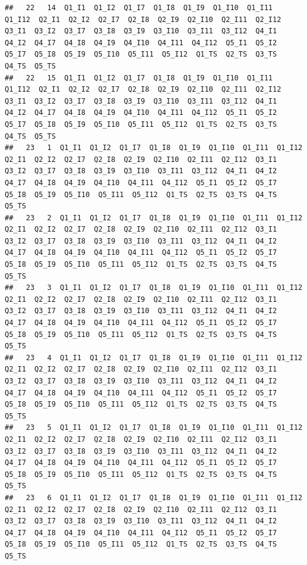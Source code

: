 \documentclass[]{book}
\begin{document}
\begin{verbatim}
##   22   14  Q1_I1  Q1_I2  Q1_I7  Q1_I8  Q1_I9  Q1_I10  Q1_I11  Q1_I12  Q2_I1  Q2_I2  Q2_I7  Q2_I8  Q2_I9  Q2_I10  Q2_I11  Q2_I12  Q3_I1  Q3_I2  Q3_I7  Q3_I8  Q3_I9  Q3_I10  Q3_I11  Q3_I12  Q4_I1  Q4_I2  Q4_I7  Q4_I8  Q4_I9  Q4_I10  Q4_I11  Q4_I12  Q5_I1  Q5_I2  Q5_I7  Q5_I8  Q5_I9  Q5_I10  Q5_I11  Q5_I12  Q1_TS  Q2_TS  Q3_TS  Q4_TS  Q5_TS
##   22   15  Q1_I1  Q1_I2  Q1_I7  Q1_I8  Q1_I9  Q1_I10  Q1_I11  Q1_I12  Q2_I1  Q2_I2  Q2_I7  Q2_I8  Q2_I9  Q2_I10  Q2_I11  Q2_I12  Q3_I1  Q3_I2  Q3_I7  Q3_I8  Q3_I9  Q3_I10  Q3_I11  Q3_I12  Q4_I1  Q4_I2  Q4_I7  Q4_I8  Q4_I9  Q4_I10  Q4_I11  Q4_I12  Q5_I1  Q5_I2  Q5_I7  Q5_I8  Q5_I9  Q5_I10  Q5_I11  Q5_I12  Q1_TS  Q2_TS  Q3_TS  Q4_TS  Q5_TS
##   23   1  Q1_I1  Q1_I2  Q1_I7  Q1_I8  Q1_I9  Q1_I10  Q1_I11  Q1_I12  Q2_I1  Q2_I2  Q2_I7  Q2_I8  Q2_I9  Q2_I10  Q2_I11  Q2_I12  Q3_I1  Q3_I2  Q3_I7  Q3_I8  Q3_I9  Q3_I10  Q3_I11  Q3_I12  Q4_I1  Q4_I2  Q4_I7  Q4_I8  Q4_I9  Q4_I10  Q4_I11  Q4_I12  Q5_I1  Q5_I2  Q5_I7  Q5_I8  Q5_I9  Q5_I10  Q5_I11  Q5_I12  Q1_TS  Q2_TS  Q3_TS  Q4_TS  Q5_TS
##   23   2  Q1_I1  Q1_I2  Q1_I7  Q1_I8  Q1_I9  Q1_I10  Q1_I11  Q1_I12  Q2_I1  Q2_I2  Q2_I7  Q2_I8  Q2_I9  Q2_I10  Q2_I11  Q2_I12  Q3_I1  Q3_I2  Q3_I7  Q3_I8  Q3_I9  Q3_I10  Q3_I11  Q3_I12  Q4_I1  Q4_I2  Q4_I7  Q4_I8  Q4_I9  Q4_I10  Q4_I11  Q4_I12  Q5_I1  Q5_I2  Q5_I7  Q5_I8  Q5_I9  Q5_I10  Q5_I11  Q5_I12  Q1_TS  Q2_TS  Q3_TS  Q4_TS  Q5_TS
##   23   3  Q1_I1  Q1_I2  Q1_I7  Q1_I8  Q1_I9  Q1_I10  Q1_I11  Q1_I12  Q2_I1  Q2_I2  Q2_I7  Q2_I8  Q2_I9  Q2_I10  Q2_I11  Q2_I12  Q3_I1  Q3_I2  Q3_I7  Q3_I8  Q3_I9  Q3_I10  Q3_I11  Q3_I12  Q4_I1  Q4_I2  Q4_I7  Q4_I8  Q4_I9  Q4_I10  Q4_I11  Q4_I12  Q5_I1  Q5_I2  Q5_I7  Q5_I8  Q5_I9  Q5_I10  Q5_I11  Q5_I12  Q1_TS  Q2_TS  Q3_TS  Q4_TS  Q5_TS
##   23   4  Q1_I1  Q1_I2  Q1_I7  Q1_I8  Q1_I9  Q1_I10  Q1_I11  Q1_I12  Q2_I1  Q2_I2  Q2_I7  Q2_I8  Q2_I9  Q2_I10  Q2_I11  Q2_I12  Q3_I1  Q3_I2  Q3_I7  Q3_I8  Q3_I9  Q3_I10  Q3_I11  Q3_I12  Q4_I1  Q4_I2  Q4_I7  Q4_I8  Q4_I9  Q4_I10  Q4_I11  Q4_I12  Q5_I1  Q5_I2  Q5_I7  Q5_I8  Q5_I9  Q5_I10  Q5_I11  Q5_I12  Q1_TS  Q2_TS  Q3_TS  Q4_TS  Q5_TS
##   23   5  Q1_I1  Q1_I2  Q1_I7  Q1_I8  Q1_I9  Q1_I10  Q1_I11  Q1_I12  Q2_I1  Q2_I2  Q2_I7  Q2_I8  Q2_I9  Q2_I10  Q2_I11  Q2_I12  Q3_I1  Q3_I2  Q3_I7  Q3_I8  Q3_I9  Q3_I10  Q3_I11  Q3_I12  Q4_I1  Q4_I2  Q4_I7  Q4_I8  Q4_I9  Q4_I10  Q4_I11  Q4_I12  Q5_I1  Q5_I2  Q5_I7  Q5_I8  Q5_I9  Q5_I10  Q5_I11  Q5_I12  Q1_TS  Q2_TS  Q3_TS  Q4_TS  Q5_TS
##   23   6  Q1_I1  Q1_I2  Q1_I7  Q1_I8  Q1_I9  Q1_I10  Q1_I11  Q1_I12  Q2_I1  Q2_I2  Q2_I7  Q2_I8  Q2_I9  Q2_I10  Q2_I11  Q2_I12  Q3_I1  Q3_I2  Q3_I7  Q3_I8  Q3_I9  Q3_I10  Q3_I11  Q3_I12  Q4_I1  Q4_I2  Q4_I7  Q4_I8  Q4_I9  Q4_I10  Q4_I11  Q4_I12  Q5_I1  Q5_I2  Q5_I7  Q5_I8  Q5_I9  Q5_I10  Q5_I11  Q5_I12  Q1_TS  Q2_TS  Q3_TS  Q4_TS  Q5_TS

\end{verbatim}
\end{document}
